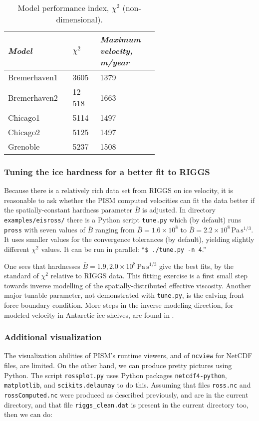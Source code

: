 \small
\begin{table}[ht]
\centering
\caption{Model performance index, $\chi^2$ (non-dimensional).  }\label{tab:chisqr}
\begin{tabular}{p{0.2\linewidth}p{0.1\linewidth}p{0.3\linewidth}}\toprule
\textsl{Model} & $\chi^2$ & \textsl{Maximum velocity, m/year} \\\midrule
Bremerhaven1 & 3605 & 1379 \\
Bremerhaven2 & 12\,518 & 1663 \\
Chicago1 & 5114 & 1497 \\
Chicago2 & 5125 & 1497 \\
Grenoble & 5237 & 1508 \\
\bottomrule
\end{tabular}
\end{table}
\normalsize

\subsubsection*{Tuning the ice hardness for a better fit to RIGGS}  Because there is a relatively rich data set from RIGGS on ice velocity, it is reasonable to ask whether the PISM computed velocities can fit the data better if the spatially-constant hardness parameter $\bar B$ is adjusted.  In directory \texttt{examples/eisross/} there is a Python script \texttt{tune.py} which (by default) runs \texttt{pross} with seven values of $\bar B$ ranging from $\bar B = 1.6  \times 10^8$ to $\bar B = 2.2 \times 10^8 \, \text{Pa}\, \text{s}^{1/3}$.  It uses smaller values for the convergence tolerances (by default), yielding slightly different $\chi^2$ values.  It can be run in parallel: ``\texttt{\$ ./tune.py -n 4}.''

One sees that hardnesses $\bar B = 1.9,2.0 \times 10^8 \, \text{Pa}\, \text{s}^{1/3}$ give the best fits, by the standard of $\chi^2$ relative to RIGGS data.  This fitting exercise is a first small step towards inverse modelling of the spatially-distributed effective viscosity.  Another major tunable parameter, not demonstrated with \texttt{tune.py}, is the calving front force boundary condition.  More steps in the inverse modeling direction, for modeled velocity in Antarctic ice shelves, are found in \cite{HumbertGreveHutter,RommelaereMacAyeal}.


\subsubsection*{Additional visualization}  The visualization abilities of PISM's runtime viewers, and of \texttt{ncview} for NetCDF files, are limited.  On the other hand, we can produce pretty pictures using Python.  The script \texttt{rossplot.py} uses Python packages \texttt{netcdf4-python}, \texttt{matplotlib}, and \texttt{scikits.delaunay} to do this.  Assuming that files \texttt{ross.nc} and \texttt{rossComputed.nc} were produced as described previously, and are in the current directory, and that file \texttt{riggs_clean.dat} is present in the current directory too, then we can do:

